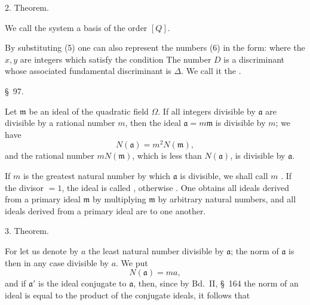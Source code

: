 
2. Theorem. 

We call the system
a basis of the order $[Q]$.

By substituting (5) one can also represent the numbers (6) in the form:
where the $x, y$ are integers which satisfy the condition
The number $D$ is a discriminant whose associated fundamental discriminant is $\Delta$. We call it the .

\begin{center}
\S\ 97. 
\end{center}

Let $\mathfrak{m}$ be an ideal of the quadratic field $\Omega$. If all integers divisible by $\mathfrak{a}$ are divisible by a rational number $m$, then the ideal $\mathfrak{a} = m\mathfrak{m}$ is divisible by $m$; we have
\[ N(\mathfrak{a}) = m^2 N(\mathfrak{m}), \]
and the rational number $m N(\mathfrak{m})$, which is less than $N(\mathfrak{a})$, is divisible by $\mathfrak{a}$.

If $m$ is the greatest natural number by which $\mathfrak{a}$ is divisible, we shall call $m$ . If the divisor $= 1$, the ideal is called , otherwise . One obtains all ideals derived from a primary ideal $\mathfrak{m}$ by multiplying $\mathfrak{m}$ by arbitrary natural numbers, and all ideals derived from a primary ideal are  to one another.

3. Theorem. 

For let us denote by $a$ the least natural number divisible by $\mathfrak{a}$; the norm of $\mathfrak{a}$ is then in any case divisible by $a$. We put
\[ N(\mathfrak{a}) = ma, \]
and if $\mathfrak{a}'$ is the ideal conjugate to $\mathfrak{a}$, then, since by Bd.\ II, \S\ 164 the norm of an ideal is equal to the product of the conjugate ideals, it follows that
